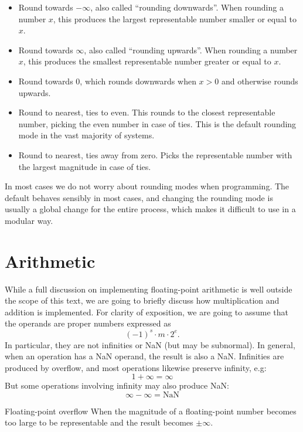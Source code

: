 \begin{itemize}
\item Round towards $-\infty$, also called ``rounding downwards''.
  When rounding a number $x$, this produces the largest representable
  number smaller or equal to $x$.
\item Round towards $\infty$, also called ``rounding upwards''.
  When rounding a number $x$, this produces the smallest representable
  number greater or equal to $x$.
\item Round towards $0$, which rounds downwards when $x>0$ and
  otherwise rounds upwards.
\item Round to nearest, ties to even.  This rounds to the closest
  representable number, picking the even number in case of ties.  This
  is the default rounding mode in the vast majority of systems.
\item Round to nearest, ties away from zero.  Picks the representable
  number with the largest magnitude in case of ties.
\end{itemize}

In most cases we do not worry about rounding modes when programming.
The default behaves sensibly in most cases, and changing the rounding
mode is usually a global change for the entire process, which makes it
difficult to use in a modular way.

\section{Arithmetic}
\label{sec:float-arithmetic}

While a full discussion on implementing floating-point arithmetic is
well outside the scope of this text, we are going to briefly discuss
how multiplication and addition is implemented.  For clarity of
exposition, we are going to assume that the operands are proper
numbers expressed as
\[
  (-1)^{s} \cdot m \cdot 2^{e}.
\]
In particular, they are not infinities or NaN (but may be subnormal).
In general, when an operation has a NaN operand, the result is also a
NaN.  Infinities are produced by overflow, and most operations
likewise preserve infinity, e.g:
\begin{equation}
  1 + \infty = \infty
\end{equation}
But some operations involving infinity may also produce NaN:
\begin{equation}
  \infty - \infty = \text{NaN}
\end{equation}

\begin{definition}{Floating-point overflow}
  When the magnitude of a floating-point number becomes too large to
  be representable and the result becomes $\pm\infty$.
\end{definition}

